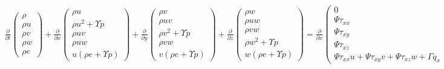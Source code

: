 \begin{align*}
\frac{\partial}{\partial t}
\begin{pmatrix}
\rho
\\
\rho u
\\
\rho v
\\
\rho w
\\
\rho e
\end{pmatrix}
+
\frac{\partial}{\partial x}
\begin{pmatrix}
\rho u
\\
\rho u^2 + \Upsilon p
\\
\rho uv
\\
\rho uw
\\
u\left(\rho e+\Upsilon p\right)
\end{pmatrix}
+
\frac{\partial}{\partial y}
\begin{pmatrix}
\rho v
\\
\rho uv
\\
\rho v^2 + \Upsilon p
\\
\rho vw
\\
v\left(\rho e+\Upsilon p\right)
\end{pmatrix}
+
\frac{\partial}{\partial z}
\begin{pmatrix}
\rho w
\\
\rho uw
\\
\rho vw
\\
\rho w^2 + \Upsilon p
\\
w\left(\rho e+\Upsilon p\right)
\end{pmatrix}
=
\frac{\partial}{\partial x}
\begin{pmatrix}
0
\\
\Psi \tau_{xx}
\\
\Psi \tau_{xy}
\\
\Psi \tau_{xz}
\\
\Psi \tau_{xx}u+\Psi \tau_{xy}v+\Psi \tau_{xz}w+\Gamma q_x
\end{pmatrix}
+\frac{\partial}{\partial y}
\begin{pmatrix}
0
\\
\Psi \tau_{yx}
\\
\Psi \tau_{yy}
\\
\Psi \tau_{yz}
\\
\Psi \tau_{yx}u+\Psi \tau_{yy}v+\Psi \tau_{yz}w+\Gamma q_y
\end{pmatrix}
+
\frac{\partial}{\partial z}
\begin{pmatrix}
0
\\
\Psi \tau_{zx}
\\
\Psi \tau_{zy}
\\
\Psi \tau_{zz}
\\
\Psi \tau_{zx}u+\Psi \tau_{zy}v+\Psi \tau_{zz}w+\Gamma q_z
\end{pmatrix}
\end{align*}

